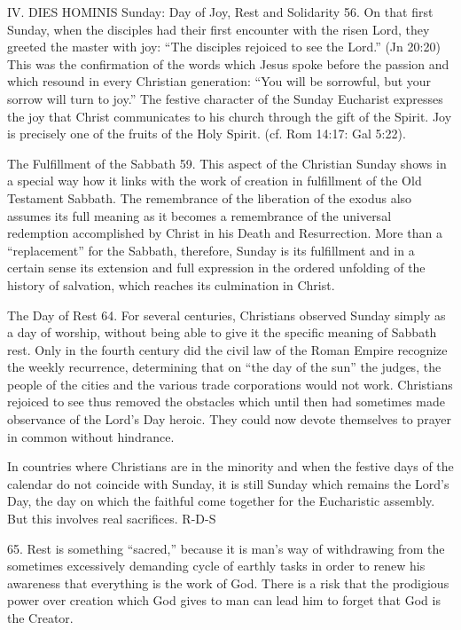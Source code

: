 \documentclass[oneside]{book}
\begin{document}
IV. DIES HOMINIS
Sunday: Day of Joy, Rest and Solidarity
56. On that first Sunday, when the disciples had their first encounter with the
risen Lord, they greeted the master with joy: ``The disciples rejoiced to see
the Lord.'' (Jn 20:20) This was the confirmation of the words which Jesus spoke
before the passion and which resound in every Christian generation: ``You will
be sorrowful, but your sorrow will turn to joy.'' The festive character of the
Sunday Eucharist expresses the joy that Christ communicates to his church
through the gift of the Spirit. Joy is precisely one of the fruits of the Holy
Spirit. (cf. Rom 14:17: Gal 5:22).

The Fulfillment of the Sabbath
59. This aspect of the Christian Sunday shows in a special way how it links with
the work of creation in fulfillment of the Old Testament Sabbath. The
remembrance of the liberation of the exodus also assumes its full meaning as it
becomes a remembrance of the universal redemption accomplished by Christ in his
Death and Resurrection. More than a ``replacement'' for the Sabbath, therefore,
Sunday is its fulfillment and in a certain sense its extension and full
expression in the ordered unfolding of the history of salvation, which reaches
its culmination in Christ.

The Day of Rest
64. For several centuries, Christians observed Sunday simply as a day of
worship, without being able to give it the specific meaning of Sabbath
rest. Only in the fourth century did the civil law of the Roman Empire recognize
the weekly recurrence, determining that on ``the day of the sun'' the judges,
the people of the cities and the various trade corporations would not
work. Christians rejoiced to see thus removed the obstacles which until then had
sometimes made observance of the Lord's Day heroic. They could now devote
themselves to prayer in common without hindrance.

In countries where Christians are in the minority and when the festive days of
the calendar do not coincide with Sunday, it is still Sunday which remains the
Lord's Day, the day on which the faithful come together for the Eucharistic
assembly. But this involves real sacrifices.
R-D-S

65. Rest is something ``sacred,'' because it is man's way of withdrawing from
the sometimes excessively demanding cycle of earthly tasks in order to renew his
awareness that everything is the work of God. There is a risk that the
prodigious power over creation which God gives to man can lead him to forget
that God is the Creator.
\end{document}
